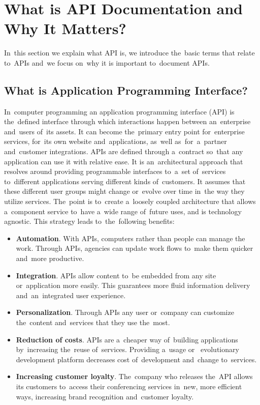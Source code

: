 \section{What is API Documentation and Why It Matters?}
In~this section we explain what API is, we introduce the~basic terms that relate
to~APIs and~we focus on~why it is important to~document APIs.

\subsection{What is Application Programming Interface?}
In~computer programming an application programming interface (API) is
the~defined interface through which interactions happen between an~enterprise
and~users of~its assets. It can become the~primary entry point for~enterprise
services, for~its own website and~applications, as~well as~for~a~partner and~customer integrations. APIs are
defined through a~contract so~that any application can use it with relative
ease. It is an~architectural approach that resolves around
providing programmable interfaces to~a~set of~services to~different applications
serving different kinds of~customers. It assumes that these different user
groups might change or~evolve over time in~the way they utilize services.
The~point is to~create a~loosely coupled architecture that allows a~component
service to~have a~wide range of~future uses, and is technology agnostic.
This strategy leads to~the~following benefits:

\begin{itemize}
  \item \textbf{Automation}. With APIs, computers rather than people can manage
  the work. Through APIs, agencies can update work flows to~make them quicker
  and~more productive.
  \item \textbf{Integration}. APIs allow content to~be embedded from any site
  or~application more easily. This guarantees more fluid information delivery
  and~an~integrated user experience.
  \item \textbf{Personalization}. Through APIs any user or~company can customize
  the~content and~services that they use the~most.
  \item \textbf{Reduction of costs}. APIs are a~cheaper way of~building
  applications by~increasing the~reuse of~services. Providing a~usage or~
  evolutionary development platform decreases cost of~development and~change
  to~services.
  \item \textbf{Increasing customer loyalty}. The~company who releases
  the~API allows its customers to~access their conferencing services in~new,
  more efficient ways, increasing brand recognition and~customer loyalty.
\end{itemize}

